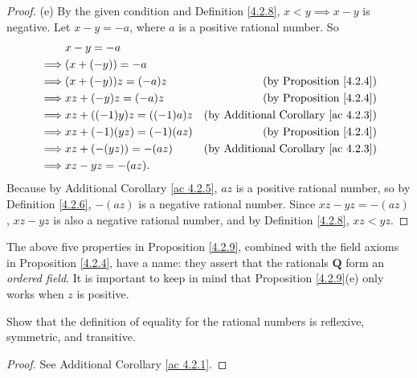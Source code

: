 \begin{proof}{(e)}
    By the given condition and Definition \ref{4.2.8}, \(x < y \implies x - y\) is negative.
    Let \(x - y = -a\), where \(a\) is a positive rational number.
    So
    \begin{align*}
                 & x - y = -a                                                                 \\
        \implies & (x + (-y)) = -a                                                            \\
        \implies & (x + (-y))z = (-a)z      & \text{(by Proposition \ref{4.2.4})}             \\
        \implies & xz + (-y)z = (-a)z       & \text{(by Proposition \ref{4.2.4})}             \\
        \implies & xz + ((-1)y)z = ((-1)a)z & \text{(by Additional Corollary \ref{ac 4.2.3})} \\
        \implies & xz + (-1)(yz) = (-1)(az) & \text{(by Proposition \ref{4.2.4})}             \\
        \implies & xz + (-(yz)) = -(az)     & \text{(by Additional Corollary \ref{ac 4.2.3})} \\
        \implies & xz - yz = -(az).
    \end{align*}
    Because by Additional Corollary \ref{ac 4.2.5}, \(az\) is a positive rational number, so by Definition \ref{4.2.6}, \(-(az)\) is a negative rational number.
    Since \(xz - yz = -(az)\), \(xz - yz\) is also a negative rational number, and by Definition \ref{4.2.8}, \(xz < yz\).
\end{proof}

\begin{remark}\label{4.2.10}
    The above five properties in Proposition \ref{4.2.9}, combined with the field axioms in Proposition \ref{4.2.4}, have a name:
    they assert that the rationals \(\mathbf{Q}\) form an \emph{ordered field}.
    It is important to keep in mind that Proposition \ref{4.2.9}(e) only works when \(z\) is positive.
\end{remark}

\exercisesection

\begin{exercise}\label{ex 4.2.1}
    Show that the definition of equality for the rational numbers is reflexive, symmetric, and transitive.
\end{exercise}

\begin{proof}
    See Additional Corollary \ref{ac 4.2.1}.
\end{proof}

